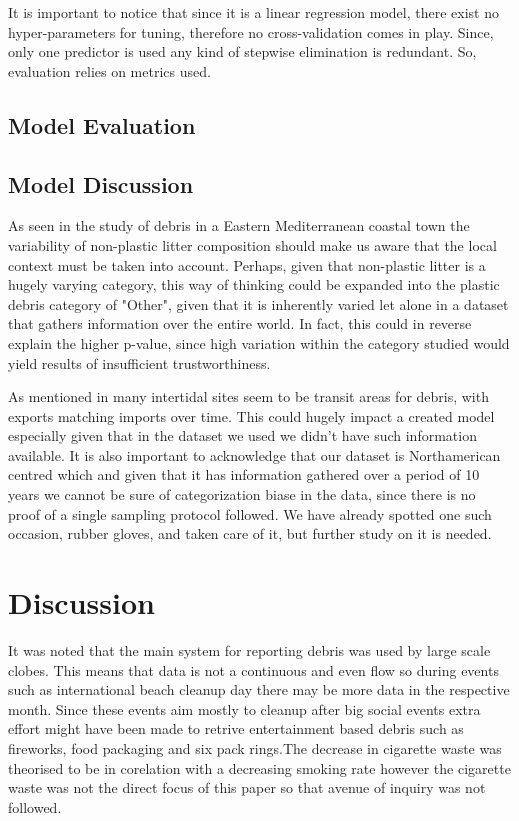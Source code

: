 \documentclass[10pt]{article}\usepackage[]{graphicx}\usepackage[]{color}
\begin{document}
It is important to notice that since it is a linear regression model, there exist no hyper-parameters for tuning, therefore no cross-validation comes in play. Since, only one predictor is used any kind of stepwise elimination is redundant. So, evaluation relies on metrics used.\\



\subsection{Model Evaluation}


\subsection{Model Discussion}


As seen in the study of debris in a Eastern Mediterranean coastal town \cite{PORTMAN2017} the variability of non-plastic litter composition should make us aware that the local context must be taken into account. Perhaps, given that non-plastic litter is a hugely varying category, this way of thinking could be expanded into the plastic debris category of "Other", given that it is inherently varied let alone in a dataset that gathers information over the entire world. In fact, this could in reverse explain the higher p-value, since high variation within the category studied would yield results of insufficient trustworthiness. 

As mentioned in \cite{BROWNE2015} many intertidal sites seem to be transit areas for debris, with exports matching imports over
time. This could hugely impact a created model especially given that in the dataset we used we didn't have such information available. It is also important to acknowledge that our dataset is Northamerican centred which and given that it has information gathered over a period of 10 years we cannot be sure of categorization biase in the data, since there is no proof of a single sampling protocol followed. We have already spotted one such occasion, rubber gloves, and taken care of it, but further study on it is needed.



\pagebreak
\section{Discussion}

It was noted that the main system for reporting debris was used by large scale clobes. This means that data is not a continuous and even flow so during events such as international beach cleanup day there may be more data in the respective month. Since these events aim mostly to cleanup after big social events extra effort might have been made to retrive entertainment based debris such as fireworks, food packaging and six pack rings.The decrease in cigarette waste was theorised to be in corelation with a decreasing smoking rate however the cigarette waste was not the direct focus of this paper so that avenue of inquiry was not followed.
\end{document}
